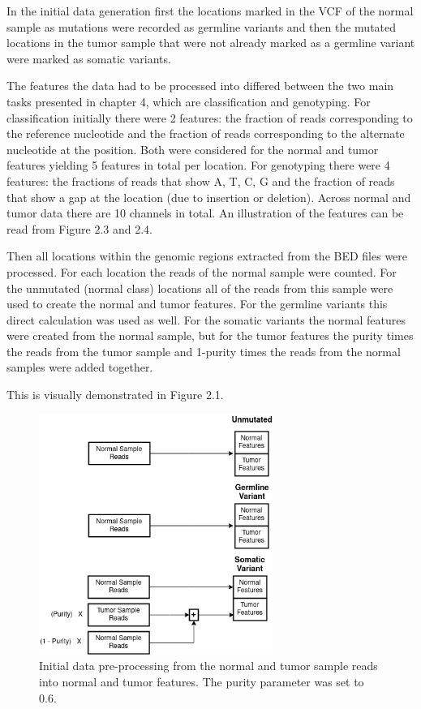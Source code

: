 \documentclass[bsc,frontabs,singlespacing,parskip,deptreport]{infthesis}
\begin{document}
In the initial data generation first the locations marked in the VCF of the normal sample as mutations were recorded as germline variants and then the mutated locations in the tumor sample that were not already marked as a germline variant were marked as somatic variants.

The features the data had to be processed into differed between the two main tasks presented in chapter 4, which are classification and genotyping. For classification initially there were 2 features: the fraction of reads corresponding to the reference nucleotide and the fraction of reads corresponding to the alternate nucleotide at the position. Both were considered for the normal and tumor features yielding 5 features in total per location. For genotyping there were 4 features: the fractions of reads that show A, T, C, G and the fraction of reads that show a gap at the location (due to insertion or deletion). Across normal and tumor data there are 10 channels in total. An illustration of the features can be read from Figure 2.3 and 2.4.

Then all locations within the genomic regions extracted from the BED files were processed. For each location the reads of the normal sample were counted. For the unmutated (normal class) locations all of the reads from this sample were used to create the normal and tumor features. For the germline variants this direct calculation was used as well. For the somatic variants the normal features were created from the normal sample, but for the tumor features the purity times the reads from the tumor sample and 1-purity times the reads from the normal samples were added together.

This is visually demonstrated in Figure 2.1.

\begin{figure}
\centering
\includegraphics[width = 3in]{preprocess_initial}
\setlength{\belowcaptionskip}{0pt}
\caption{Initial data pre-processing from the normal and tumor sample reads into normal and tumor features. The purity parameter was set to 0.6.}
\label{preprocess_initial}
\vskip -5mm
\end{figure}
\end{document}
